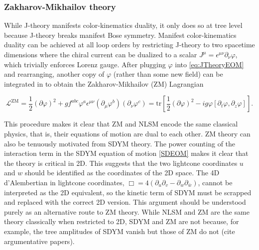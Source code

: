 \documentclass[11pt,letter]{article}
\def\be{\begin{equation}}
\def\ee{\end{equation}}
\begin{document}
\subsubsection{Zakharov-Mikhailov theory}
\label{sec:ZMTheory}
While J-theory manifests color-kinematics duality, it only does so at tree level because J-theory breaks manifest Bose symmetry.
Manifest color-kinematics duality can be achieved at all loop orders by restricting J-theory to two spacetime dimensions where the chiral current can be dualized to a scalar $J^\mu = \epsilon^{\mu\nu} \partial_\nu \varphi$, which trivially enforces Lorenz gauge.
After plugging $\varphi$ into \cref{eq:JTheoryEOM} and rearranging, another copy of $\varphi$ (rather than some new field) can be integrated in to obtain the Zakharov-Mikhailov (ZM) Lagrangian
\begin{eBox}
\be
\label{eq:ZMLagrangian}
\mathcal{L}^{\text{ZM}} = \frac{1}{2}(\partial \varphi)^2 + g f^{abc} \varphi^a \epsilon^{\mu\nu}(\partial_\mu \varphi^b)( \partial_\nu \varphi^c) =  \text{tr}\left[\frac{1}{2}(\partial \varphi)^2-i g \varphi [\partial_t \varphi, \partial_z \varphi ]\right] .
\ee
\end{eBox}
This procedure makes it clear that ZM and NLSM encode the same classical physics, that is, their equations of motion are dual to each other.
ZM theory can also be tenuously motivated from SDYM theory.
The power counting of the interaction term in the SDYM equation of motion \cref{SDEOM} makes it clear that the theory is critical in 2D.
This suggests that the two lightcone coordinates $u$ and $w$ should be identified as the coordinates of the 2D space.
The 4D d'Alembertian in lightcone coordinates, $\Box = 4 (\partial_u \partial_v - \partial_w \partial_{\bar{w}})$, cannot be interpreted as the 2D equivalent, so the kinetic term of SDYM must be scrapped and replaced with the correct 2D version.
This argument should be understood purely as an alternative route to ZM theory.
While NLSM and ZM are the same theory classically when restricted to 2D, SDYM and ZM are not because, for example, the tree amplitudes of SDYM vanish but those of ZM do not (cite argumentative papers).
\end{document}
